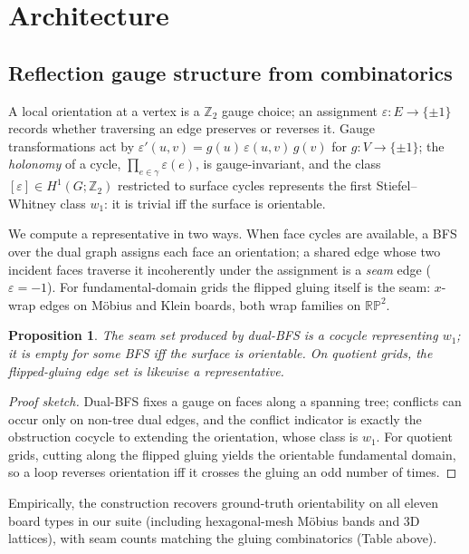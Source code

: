 \documentclass[11pt]{article}
\newtheorem{proposition}{Proposition}
\newcommand{\eps}{\varepsilon}
\newcommand{\ZZ}{\mathbb{Z}}
\newcommand{\RP}{\mathbb{RP}}
\begin{document}
\section{Architecture}
\subsection{Reflection gauge structure from combinatorics}
\label{sec:gauge}
A local orientation at a vertex is a $\ZZ_2$ gauge choice; an assignment
$\eps: E\to\{\pm 1\}$ records whether traversing an edge preserves or
reverses it. Gauge transformations act by $\eps'(u,v)=g(u)\,\eps(u,v)\,
g(v)$ for $g:V\to\{\pm1\}$; the \emph{holonomy} of a cycle,
$\prod_{e\in\gamma}\eps(e)$, is gauge-invariant, and the class
$[\eps]\in H^1(G;\ZZ_2)$ restricted to surface cycles represents the
first Stiefel--Whitney class $w_1$: it is trivial iff the surface is
orientable.

We compute a representative in two ways. When face cycles are available,
a BFS over the dual graph assigns each face an orientation; a shared edge
whose two incident faces traverse it incoherently under the assignment is
a \emph{seam} edge ($\eps=-1$). For fundamental-domain grids the flipped
gluing itself is the seam: $x$-wrap edges on M\"obius and Klein boards,
both wrap families on $\RP^2$.

\begin{proposition}
The seam set produced by dual-BFS is a cocycle representing $w_1$; it is
empty for some BFS iff the surface is orientable. On quotient grids, the
flipped-gluing edge set is likewise a representative.
\end{proposition}
\begin{proof}[Proof sketch]
Dual-BFS fixes a gauge on faces along a spanning tree; conflicts can occur
only on non-tree dual edges, and the conflict indicator is exactly the
obstruction cocycle to extending the orientation, whose class is $w_1$.
For quotient grids, cutting along the flipped gluing yields the orientable
fundamental domain, so a loop reverses orientation iff it crosses the
gluing an odd number of times.
\end{proof}
Empirically, the construction recovers ground-truth orientability on all
eleven board types in our suite (including hexagonal-mesh M\"obius bands
and 3D lattices), with seam counts matching the gluing combinatorics
(Table above).
\end{document}
